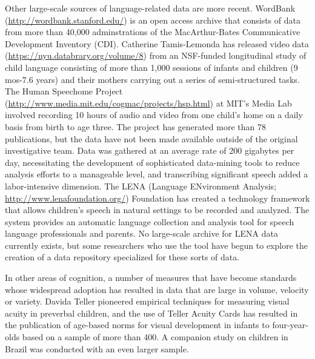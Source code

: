 \documentclass[letterpaper,man,apacite]{apa6}
\begin{document}
Other large-scale sources of language-related data are more recent.
WordBank (\url{http://wordbank.stanford.edu/}) is an open access archive that consists of data from more than 40,000 adminstrations of the MacArthur-Bates Communicative Development Inventory (CDI).
Catherine Tamis-Lemonda has released video data (\url{https://nyu.databrary.org/volume/8}) from an NSF-funded longitudinal study of child language consisting of more than 1,000 sessions of infants and children (9 mos-7.6 years) and their mothers carrying out a series of semi-structured tasks.
The Human Speechome Project (\url{http://www.media.mit.edu/cogmac/projects/hsp.html}) at MIT's Media Lab involved recording 10 hours of audio and video from one child's home on a daily basis from birth to age three.
The project has generated more than 78 publications, but the data have not been made available outside of the original investigative team.
Data was gathered at an average rate of 200 gigabytes per day, necessitating the development of sophisticated data-mining tools to reduce analysis efforts to a manageable level, and transcribing significant speech added a labor-intensive dimension.
The LENA (Language ENvironment Analysis; \url{http://www.lenafoundation.org/}) Foundation has created a technology framework that allows children's speech in natural settings to be recorded and analyzed.
The system provides an automatic language collection and analysis tool for speech language professionals and parents.
No large-scale archive for LENA data currently exists, but some researchers who use the tool have begun to explore the creation of a data repository specialized for these sorts of data.

In other areas of cognition, a number of measures that have become standards whose widespread adoption has resulted in data that are large in volume, velocity or variety.
Davida Teller pioneered empirical techniques for measuring visual acuity in preverbal children, and the use of Teller Acuity Cards has resulted in the publication of age-based norms for visual development in infants to four-year-olds \cite{mayer_monocular_1995} based on a sample of more than 400.
A companion study on children in Brazil \cite{salomao_large_1995} was conducted with an even larger sample.
\end{document}
